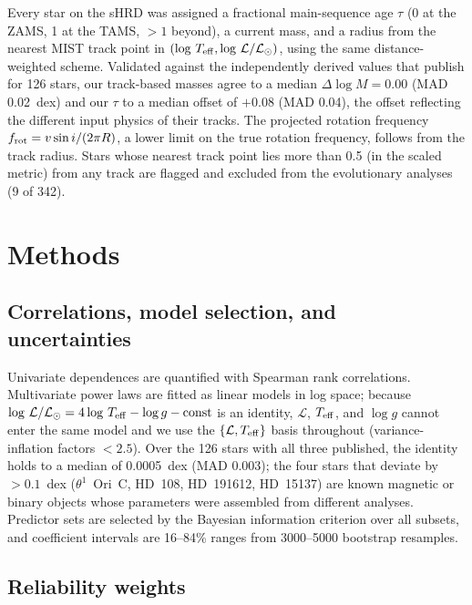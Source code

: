 \documentclass[twocolumn]{aastex631}
\newcommand{\vsini}{v\sin i}
\newcommand{\teff}{T_{\rm eff}}
\renewcommand{\ell}{\mathcal{L}}
\newcommand{\lgL}{\log\,\ell/\ell_\odot}
\newcommand{\lgT}{\log\,\teff}
\begin{document}
Every star on the sHRD was assigned a fractional main-sequence age $\tau$ (0 at the ZAMS, 1 at the TAMS, $>1$ beyond), a current mass, and a radius from the nearest MIST track point in $(\lgT,\lgL)$, using the same distance-weighted scheme. Validated against the independently derived values that \citet{shen2024} publish for 126 stars, our track-based masses agree to a median $\Delta\log M=0.00$ (MAD 0.02~dex) and our $\tau$ to a median offset of $+0.08$ (MAD 0.04), the offset reflecting the different input physics of their tracks. The projected rotation frequency $f_{\rm rot}=\vsini/(2\pi R)$, a lower limit on the true rotation frequency, follows from the track radius. Stars whose nearest track point lies more than 0.5 (in the scaled metric) from any track are flagged and excluded from the evolutionary analyses (9 of 342).

\section{Methods}\label{sec:methods}

\subsection{Correlations, model selection, and uncertainties}\label{sec:stats}

Univariate dependences are quantified with Spearman rank correlations. Multivariate power laws are fitted as linear models in log space; because $\lgL=4\lgT-\log g-{\rm const}$ is an identity, $\ell$, $\teff$, and $\log g$ cannot enter the same model and we use the $\{\ell,\teff\}$ basis throughout (variance-inflation factors $<2.5$). Over the 126 stars with all three published, the identity holds to a median of 0.0005~dex (MAD 0.003); the four stars that deviate by $>0.1$~dex ($\theta^1$~Ori~C, HD~108, HD~191612, HD~15137) are known magnetic or binary objects whose parameters were assembled from different analyses. Predictor sets are selected by the Bayesian information criterion over all subsets, and coefficient intervals are 16--84\% ranges from 3000--5000 bootstrap resamples.

\subsection{Reliability weights}\label{sec:weights}
\end{document}
